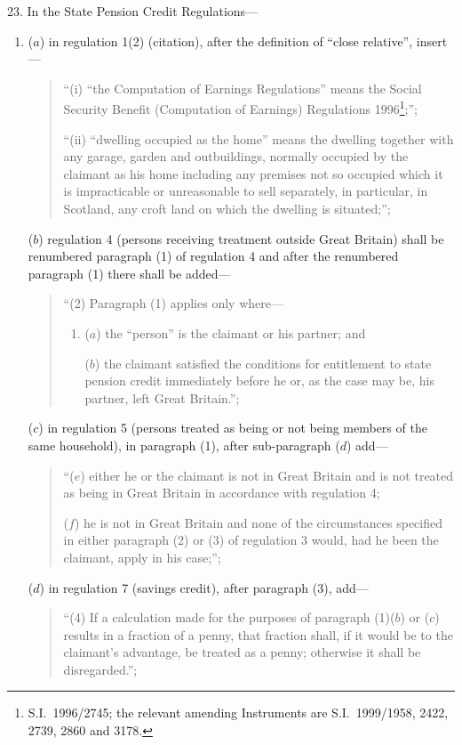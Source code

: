\documentclass[12pt,a4paper]{article}
\begin{document}
23.  In the State Pension Credit Regulations—
\begin{enumerate}\item[]
($a$) in regulation 1(2) (citation), after the definition of “close relative”, insert—
\begin{quotation}
“(i) “the Computation of Earnings Regulations” means the Social Security Benefit (Computation of Earnings) Regulations 1996\footnote{S.I.\ 1996/2745; the relevant amending Instruments are S.I.\ 1999/1958, 2422, 2739, 2860 and 3178.};”;

“(ii) “dwelling occupied as the home” means the dwelling together with any garage, garden and outbuildings, normally occupied by the claimant as his home including any premises not so occupied which it is impracticable or unreasonable to sell separately, in particular, in Scotland, any croft land on which the dwelling is situated;”;
\end{quotation}

($b$) regulation 4 (persons receiving treatment outside Great Britain) shall be renumbered paragraph (1) of regulation 4 and after the renumbered paragraph (1) there shall be added—
\begin{quotation}
“(2) Paragraph (1) applies only where—
\begin{enumerate}\item[]
($a$) the “person” is the claimant or his partner; and

($b$) the claimant satisfied the conditions for entitlement to state pension credit immediately before he or, as the case may be, his partner, left Great Britain.”;
\end{enumerate}
\end{quotation}

($c$) in regulation 5 (persons treated as being or not being members of the same household), in paragraph (1), after sub-paragraph ($d$)  add—
\begin{quotation}
“($e$) either he or the claimant is not in Great Britain and is not treated as being in Great Britain in accordance with regulation 4;

($f$) he is not in Great Britain and none of the circumstances specified in either paragraph (2) or (3) of regulation 3 would, had he been the claimant, apply in his case;”;
\end{quotation}

($d$) in regulation 7 (savings credit), after paragraph (3), add—
\begin{quotation}
“(4) If a calculation made for the purposes of paragraph (1)($b$)  or ($c$)  results in a fraction of a penny, that fraction shall, if it would be to the claimant’s advantage, be treated as a penny; otherwise it shall be disregarded.”;
\end{quotation}


\end{enumerate}
\end{document}
